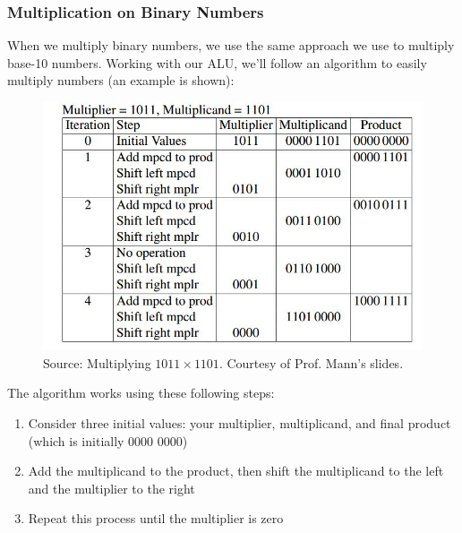 \documentclass{report}
\begin{document}
\subsubsection{Multiplication on Binary Numbers}
When we multiply binary numbers, we use the same approach we use to multiply base-10 numbers. Working with our ALU, we'll follow an algorithm to easily multiply numbers (an example is shown):
\begin{figure}[ht]
\begin{center}
\includegraphics[scale=0.45]{multiplication_example.jpg}
\end{center}
\caption{Source: Multiplying $1011 \times 1101$. Courtesy of Prof. Mann's slides.}
\end{figure}\newpage
\noindent The algorithm works using these following steps:
\begin{enumerate}
\item Consider three initial values: your multiplier, multiplicand, and final product (which is initially 0000 0000)
\item Add the multiplicand to the product, then shift the multiplicand to the left and the multiplier to the right
\item Repeat this process until the multiplier is zero
\end{enumerate}
\end{document}

